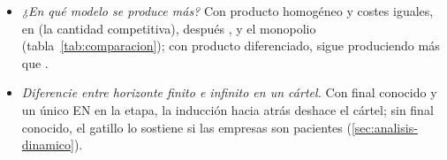 \documentclass[11pt]{article}
\begin{document}
\begin{itemize}
\begin{itemize}
  \item \emph{¿En qué modelo se produce más?} Con producto homogéneo y costes iguales, en  (la cantidad competitiva), después ,  y el monopolio (tabla~\ref{tab:comparacion}); con producto diferenciado,  sigue produciendo más que  .
  \item \emph{Diferencie entre horizonte finito e infinito en un cártel.} Con final conocido y un único EN en la etapa, la inducción hacia atrás deshace el cártel; sin final conocido, el gatillo lo sostiene si las empresas son pacientes (\ref{sec:analisis-dinamico}).
  \end{itemize}
\end{itemize}

\bibliografia
\end{document}
